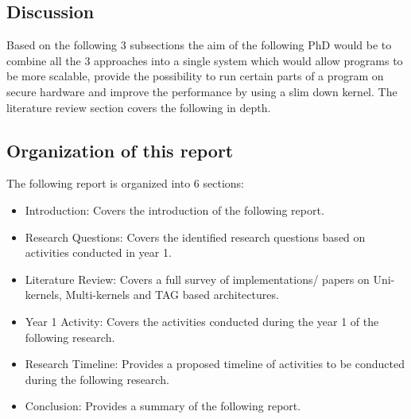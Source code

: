 \subsection{Discussion}
Based on the following 3 subsections the aim of the 
following PhD would be to combine all the 3 approaches into a 
single system which would allow programs to be more scalable, 
provide the possibility to run certain parts of a program on secure 
hardware and improve the performance by using a slim down kernel. 
The literature review section covers the following in depth. 

\subsection{Organization of this report}
The following report is organized into 6 sections:
\begin{itemize}
    \item Introduction: Covers the introduction of the following report.
    \item Research Questions: Covers the identified research questions 
    based on activities conducted in year 1.
    \item Literature Review: Covers a full survey of implementations/ papers 
    on Uni-kernels, Multi-kernels and TAG based architectures.
    \item Year 1 Activity: Covers the activities conducted during the year 1 
    of the following research.
    \item Research Timeline: Provides a proposed timeline of activities to be conducted 
    during the following research.
    \item Conclusion: Provides a summary of the following report.
\end{itemize}


